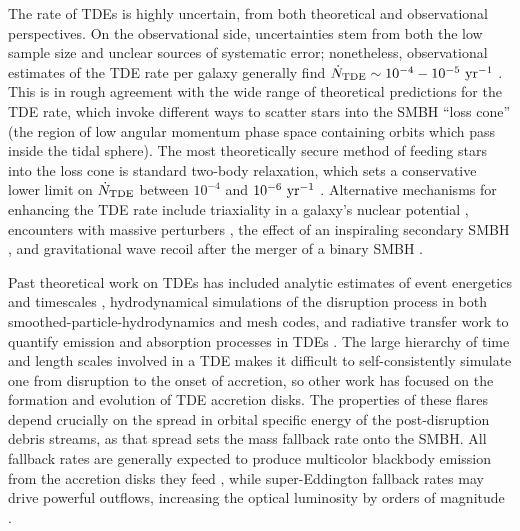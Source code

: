 \documentclass[useAMS, twocolumn, usenatbib]{mn2e}
\begin{document}
The rate of TDEs is highly uncertain, from both theoretical and observational perspectives.  On the observational side, uncertainties stem from both the low sample size and unclear sources of systematic error; nonetheless, observational estimates of the TDE rate per galaxy generally find $\dot{N}_{\rm TDE}\sim 10^{-4}-10^{-5}~{\rm yr}^{-1}$ \citep{Donley+02, Gezari+08}.  This is in rough agreement with the wide range of theoretical predictions for the TDE rate, which invoke different ways to scatter stars into the SMBH ``loss cone'' (the region of low angular momentum phase space containing orbits which pass inside the tidal sphere).  The most theoretically secure method of feeding stars into the loss cone is standard two-body relaxation, which sets a conservative lower limit on $\dot{N}_{\rm TDE}$ between $10^{-4}$ and $10^{-6}~{\rm yr}^{-1}$ \citep{FrankRees76, LightmanShapiro77, CohnKulsrud78, MagorrianTremaine99, WangMerritt04}.  Alternative mechanisms for enhancing the TDE rate include triaxiality in a galaxy's nuclear potential \citep{MerrittPoon04}, encounters with massive perturbers \citep{Perets+07}, the effect of an inspiraling secondary SMBH \citep{Ivanov+05, Chen+09, Chen+11, WeggBode11}, and gravitational wave recoil after the merger of a binary SMBH \citep{StoneLoeb11}.

Past theoretical work on TDEs has included analytic estimates of event energetics and timescales \citep{Rees88, Phinney89, Ulmer99, StrubbeQuataert09}, hydrodynamical simulations of the disruption process in both smoothed-particle-hydrodynamics \citep{NoltheniusKatz82, EvansKochanek89, Laguna+93, Lodato+09} and mesh \citep{Guillochon+09, GuillochonRamirez12} codes, and radiative transfer work to quantify emission and absorption processes in TDEs \citep{KasenRamirez10, StrubbeQuataert11}.  The large hierarchy of time and length scales involved in a TDE makes it difficult to self-consistently simulate one from disruption to the onset of accretion, so other work has focused on the formation \citep{Kochanek94} and evolution \citep{ArmijoPacheco11} of TDE accretion disks.  The properties of these flares depend crucially on the spread in orbital specific energy of the post-disruption debris streams, as that spread sets the mass fallback rate onto the SMBH.  All fallback rates are generally expected to produce multicolor blackbody emission from the accretion disks they feed \citep{LodatoRossi11}, while super-Eddington fallback rates may drive powerful outflows, increasing the optical luminosity by orders of magnitude \citep{LoebUlmer97, StrubbeQuataert09, StrubbeQuataert11}.
\end{document}
